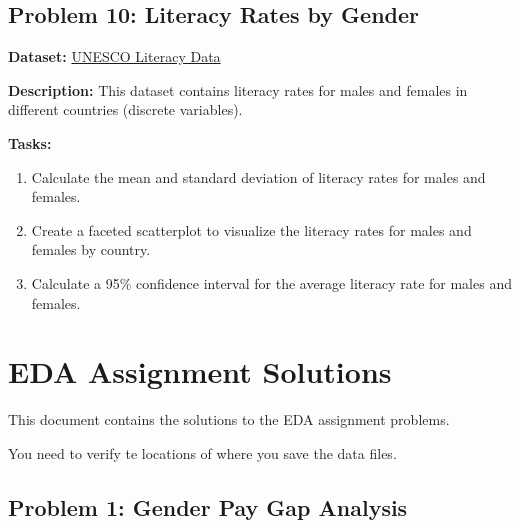 \documentclass[
  letterpaper,
  DIV=11,
  numbers=noendperiod]{scrreprt}
\providecommand{\tightlist}{%
  \setlength{\itemsep}{0pt}\setlength{\parskip}{0pt}}\usepackage{longtable,booktabs,array}
\begin{document}
\section*{Problem 10: Literacy Rates by
Gender}\label{problem-10-literacy-rates-by-gender}


\textbf{Dataset:} \href{http://uis.unesco.org/en/topic/literacy}{UNESCO
Literacy Data}

\textbf{Description:} This dataset contains literacy rates for males and
females in different countries (discrete variables).

\textbf{Tasks:}

\begin{enumerate}
\def\labelenumi{\arabic{enumi}.}
\tightlist
\item
  Calculate the mean and standard deviation of literacy rates for males
  and females.
\item
  Create a faceted scatterplot to visualize the literacy rates for males
  and females by country.
\item
  Calculate a 95\% confidence interval for the average literacy rate for
  males and females.
\end{enumerate}

\chapter*{EDA Assignment Solutions}\label{eda-assignment-solutions}


This document contains the solutions to the EDA assignment problems.

You need to verify te locations of where you save the data files.

\section*{Problem 1: Gender Pay Gap
Analysis}\label{problem-1-gender-pay-gap-analysis-1}

\end{document}
